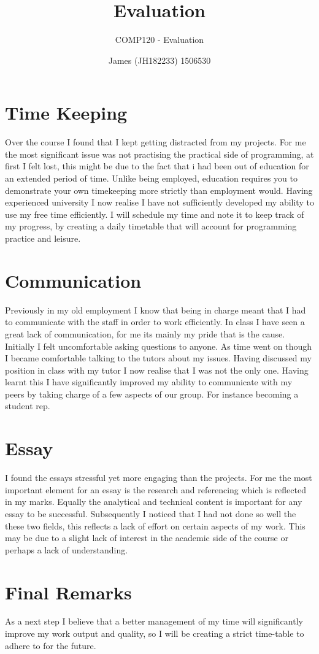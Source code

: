 \documentclass{scrartcl}
\title{Evaluation}
\subtitle{COMP120 - Evaluation}
\author{James (JH182233) 1506530}
\begin{document}
\maketitle

\section{Time Keeping}

Over the course I found that I kept getting distracted from my projects. For me the most significant issue was not practising the practical side of programming, at first I felt lost, this might be due to the fact that i had been out of education for an extended period of time. Unlike being employed, education requires you to demonstrate your own timekeeping more strictly than employment would. Having experienced university I now realise I have not sufficiently developed my ability to use my free time efficiently. I will schedule my time and note it to keep track of my progress, by creating a daily timetable that will account for programming practice and leisure.

\section{Communication}

Previously in my old employment I know that being in charge meant that I had to communicate with the staff in order to work efficiently. In class I have seen a great lack of communication, for me its mainly my pride that is the cause. Initially I felt uncomfortable asking questions to anyone. As time went on though I became comfortable talking to the tutors about my issues. Having discussed my position in class with my tutor I now realise that I was not the only one. Having learnt this I have significantly improved my ability to communicate with my peers by taking charge of a few aspects of our group. For instance becoming a student rep. 

\section{Essay}

I found the essays stressful yet more engaging than the projects. For me the most important element for an essay is the research and referencing which is reflected in my marks. Equally the analytical and technical content is important for any essay to be successful. Subsequently I noticed that I had not done so well the these two fields, this reflects a lack of effort on certain aspects of my work. This may be due to a slight lack of interest in the academic side of the course or perhaps a lack of understanding.

\section{Final Remarks}

As a next step I believe that a better management of my time will significantly improve my work output and quality, so I will be creating a strict time-table to adhere to for the future.



\end{document}
